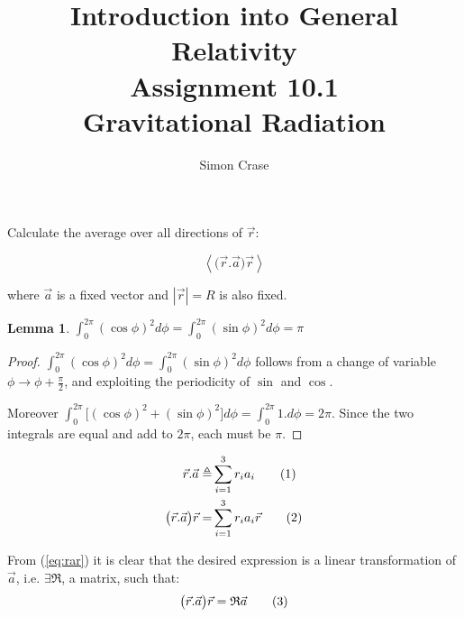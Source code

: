 \documentclass[]{article}
\title{Introduction into General Relativity\\Assignment 10.1\\Gravitational Radiation}
\author{Simon Crase}
\newcommand\numberthis{\addtocounter{equation}{1}\tag{\theequation}}
\newtheorem{lemma}{Lemma}
\begin{document}
\maketitle

Calculate the average over all directions of $\vec{r}$:

$$\left\langle \big(\vec{r}.\vec{a}\big)\vec{r} \right\rangle$$

where $\vec{a}$ is a fixed vector and $|\vec{r}|=R$ is also fixed.

\begin{lemma}\label{lemma:i1}
	$\int_{0}^{2\pi}(\cos\phi)^2  d\phi = \int_{0}^{2\pi}(\sin\phi)^2  d\phi=\pi$
\end{lemma}
\begin{proof}
	$\int_{0}^{2\pi}(\cos\phi)^2  d\phi = \int_{0}^{2\pi}(\sin\phi)^2  d\phi$ follows from a change of variable $\phi\rightarrow\phi+\frac{\pi}{2}$, and exploiting the periodicity of $\sin$ and $\cos$. 
	
	Moreover $\int_{0}^{2\pi}\big[(\cos\phi)^2  +(\sin\phi)^2\big] d\phi=\int_{0}^{2\pi}1. d\phi=2\pi$. Since the two integrals are equal and add to $2\pi$, each must be $\pi$.
\end{proof}
\begin{align*}
\vec{r}.\vec{a} \triangleq& \sum_{i=1}^{3}r_ia_i\numberthis\label{eq:ra}\\
\big(\vec{r}.\vec{a}\big)\vec{r} =& \sum_{i=1}^{3}r_ia_i \vec{r} \numberthis\label{eq:rar}
\end{align*}

From (\ref{eq:rar}) it is clear that the desired expression is a linear transformation of $\vec{a}$, i.e. $\exists \mathfrak{R}$, a matrix, such that:
\begin{align*}
\big(\vec{r}.\vec{a}\big)\vec{r} =\mathfrak{R}\vec{a} \numberthis \label{eq:linear}
\end{align*} 
\end{document}
